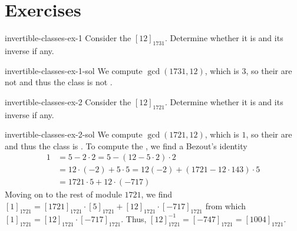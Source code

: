 \documentclass[preview]{standalone}
\begin{document}
\genpage

\section{Exercises}

\begin{snippetexercise}{invertible-classes-ex-1}{}
    Consider the \congruenceclass \({[12]}_{1731}\).
    Determine whether it is \invertiblecongclass[invertible] and its inverse if any.
\end{snippetexercise}

\begin{snippetsolution}{invertible-classes-ex-1-sol}{}
    We compute \(\gcd(1731, 12)\), which is
    \(3\), so their are not \coprime and thus the class is not \invertiblecongclass[invertible].
\end{snippetsolution}

\begin{snippetexercise}{invertible-classes-ex-2}{}
    Consider the \congruenceclass \({[12]}_{1721}\).
    Determine whether it is \invertiblecongclass[invertible] and its inverse if any.
\end{snippetexercise}

\begin{snippetsolution}{invertible-classes-ex-2-sol}{}
    We compute \(\gcd(1721, 12)\), which is
    \(1\), so their are \coprime and thus the class is \invertiblecongclass[invertible].
    To compute the \invertiblecongclass[inverse], we find a Bezout's identity
    \begin{align*}
        1 &= 5 - 2 \cdot 2 = 5-(12 - 5\cdot 2)\cdot 2 \\
        &= 12 \cdot (-2) + 5 \cdot 5 = 12(-2) + (1721 - 12 \cdot 143) \cdot 5 \\
        &= 1721 \cdot 5 + 12 \cdot (-717)
    \end{align*}
    Moving on to the rest of module \(1721\), we find
    \({[1]}_{1721} = {[1721]}_{1721} \cdot {[5]}_{1721} + {[12]}_{1721} \cdot {[-717]}_{1721}\)
    from which \({[1]}_{1721} = {[12]}_{1721} \cdot {[-717]}_{1721}\).
    Thus, \({[12]}_{1721}^{-1} = {[-747]}_{1721} = {[1004]}_{1721}\).
\end{snippetsolution}
\end{document}
